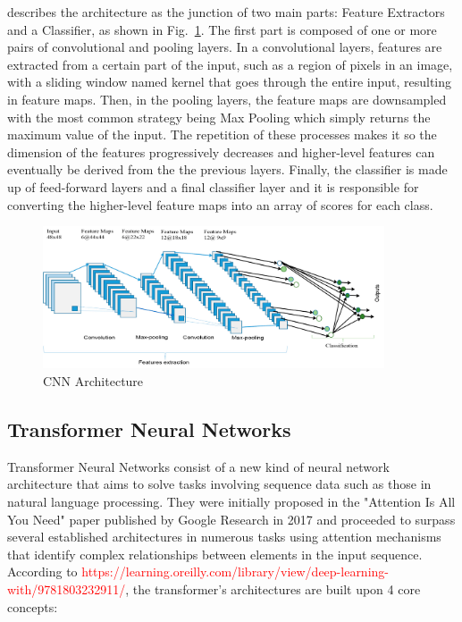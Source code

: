 \textcite{Alom2019} describes the architecture as the junction of two main parts: Feature Extractors and a Classifier, as shown in Fig.~\ref{fig:cnn_arch}. The first part is composed of one or more pairs of convolutional and pooling layers. In a convolutional layers, features are extracted from a certain part of the input, such as a region of pixels in an image, with a sliding window named kernel that goes through the entire input, resulting in feature maps. Then, in the pooling layers, the feature maps are downsampled with the most common strategy being Max Pooling which simply returns the maximum value of the input. The repetition of these processes makes it so the dimension of the features progressively decreases and higher-level features can eventually be derived from the the previous layers. Finally, the classifier is made up of feed-forward layers and a final classifier layer and it is responsible for converting the higher-level feature maps into an array of scores for each class.

\begin{figure}[!ht]
\centerline{\includegraphics[width=0.9\textwidth]{figs/cnn_arch.png}}
\caption[CNN Architecture]{CNN Architecture \cite{Alom2019}}
\label{fig:cnn_arch}
\end{figure}

\subsection{Transformer Neural Networks}
\label{subsection:transformer_neural_networks}

Transformer Neural Networks consist of a new kind of neural network architecture that aims to solve tasks involving sequence data such as those in natural language processing. They were initially proposed in the "Attention Is All You Need" paper published by Google Research in 2017\cite{Vaswani2017} and proceeded to surpass several established architectures in numerous tasks using attention mechanisms that identify complex relationships between elements in the input sequence. According to \textcolor{red}{https://learning.oreilly.com/library/view/deep-learning-with/9781803232911/}, the transformer's architectures are built upon 4 core concepts: %

